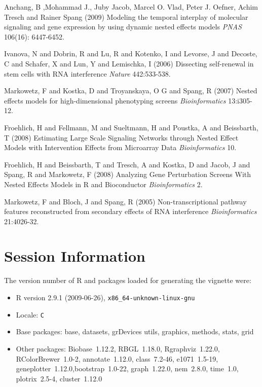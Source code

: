 \documentclass[11pt,a4paper]{article}
\begin{document}
\begin{thebibliography}{14}

 Anchang, B ,Mohammad J., Juby Jacob, Marcel O. Vlad, Peter J. Oefner, Achim Tresch and Rainer Spang  (2009)
Modeling the temporal interplay of molecular signaling and gene expression by using dynamic nested effects models {\it PNAS} 106(16): 6447-6452.

 Ivanova, N and Dobrin, R and Lu, R  and Kotenko, I and Levorse, J and Decoste, C and Schafer, X and Lun, Y and Lemischka, I  (2006)
Dissecting self-renewal in stem cells with RNA interference {\it Nature} 442:533-538.


 Markowetz, F and Kostka, D and Troyanskaya, O G and Spang, R (2007) 
Nested effects models for high-dimensional phenotyping screens
{\it Bioinformatics} 13:i305-12.

 Froehlich, H and Fellmann, M and Sueltmann, H and Poustka, A and Beissbarth, T (2008)
Estimating Large Scale Signaling Networks through Nested Effect Models with Intervention Effects from Microarray Data  {\it Bioinformatics} 10.

 Froehlich, H and Beissbarth, T and Tresch, A and Kostka, D and Jacob, J and Spang, R and Markowetz, F (2008)
Analyzing Gene Perturbation Screens With Nested Effects Models in R and Bioconductor  {\it Bioinformatics} 2.

 Markowetz, F and Bloch, J and Spang, R (2005)
Non-transcriptional pathway features reconstructed from secondary effects of RNA interference {\it Bioinformatics} 21:4026-32.


\end{thebibliography}

\section*{Session Information}

The version number of R and packages loaded for generating the vignette were:


\begin{itemize}
  \item R version 2.9.1 (2009-06-26), \verb|x86_64-unknown-linux-gnu|
  \item Locale: \verb|C|
  \item Base packages: base, datasets, grDevices utils, graphics, methods,
    stats,  grid
  \item Other packages: Biobase~1.12.2, RBGL~1.18.0, Rgraphviz~1.22.0, RColorBrewer~1.0-2,
    annotate~1.12.0, class~7.2-46, e1071~1.5-19, geneplotter~1.12.0,bootstrap~1.0-22,
    graph~1.22.0, nem~2.8.0, time~1.0, plotrix~2.5-4, cluster~1.12.0
\end{itemize}

\end{document}
